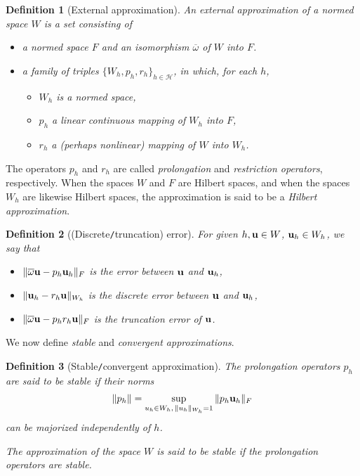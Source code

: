 \documentclass[oneside,11pt]{book}
\numberwithin{equation}{section}
\newtheorem{definition}{Definition}[section]
\begin{document}
\begin{definition}[External approximation]
    An \emph{external approximation} of a normed space $W$ is a set consisting of
    \begin{itemize}
        \item[(i)] a normed space $F$ and an isomorphism $\overline{\omega}$ of $W$ into $F$.
        \item[(ii)] a family of triples $\{W_h,p_h,r_h\}_{h\in\mathcal{H}}$, in which, for each $h$,
        \begin{itemize}
            \item $W_h$ is a normed space,
            \item $p_h$ a linear continuous mapping of $W_h$ into $F$,
            \item $r_h$ a (perhaps nonlinear) mapping of $W$ into $W_h$.
        \end{itemize}
    \end{itemize}
\end{definition}
The operators $p_h$ and $r_h$ are called \textit{prolongation} and \textit{restriction operators}, respectively. When the spaces $W$ and $F$ are Hilbert spaces, and when the spaces $W_h$ are likewise Hilbert spaces, the approximation is said to be a \textit{Hilbert approximation}.

\begin{definition}[(Discrete\texttt{/}truncation) error]
    For given $h,{\bf u}\in W$, ${\bf u}_h\in W_h$, we say that
    \begin{itemize}
        \item[(i)] $\|\overline{\omega}{\bf u} - p_h{\bf u}_h\|_F$ is the \emph{error} between ${\bf u}$ and ${\bf u}_h$,
        \item[(ii)] $\|{\bf u}_h - r_h{\bf u}\|_{W_h}$ is the \emph{discrete error} between ${\bf u}$ and ${\bf u}_h$,
        \item[(iii)] $\|\overline{\omega}{\bf u} - p_hr_h{\bf u}\|_F$ is the \emph{truncation error} of ${\bf u}$.
    \end{itemize}
\end{definition}
We now define \textit{stable} and \textit{convergent approximations}.

\begin{definition}[Stable\texttt{/}convergent approximation]
    The prolongation operators $p_h$ are said to be \emph{stable} if their norms
    \begin{align*}
        \|p_h\| = \sup_{u_h\in W_h,\,\|u_h\|_{W_h} = 1} \|p_h{\bf u}_h\|_F
    \end{align*}
    can be majorized independently of $h$.
    
    The approximation of the space $W$ is said to be \emph{stable} if the prolongation operators are stable.
\end{definition}
\end{document}
